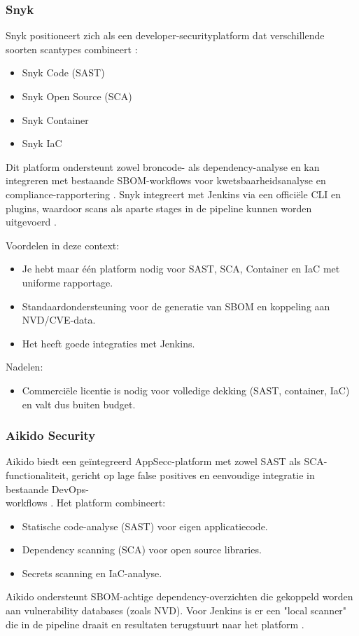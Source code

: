 \subsubsection{Snyk}
Snyk positioneert zich als een developer-securityplatform dat verschillende soorten scantypes combineert \autocite{SnykFeatures}:
\begin{itemize}
  \item Snyk Code (SAST)
  \item Snyk Open Source (SCA)
  \item Snyk Container
  \item Snyk IaC
\end{itemize}

Dit platform ondersteunt zowel broncode- als dependency-analyse en kan integreren met bestaande SBOM-workflows voor kwetsbaarheidsanalyse en compliance-rapportering \autocite{SnykFeatures}. Snyk integreert met Jenkins via een officiële CLI en plugins, waardoor scans als aparte stages in de pipeline kunnen worden uitgevoerd \autocite{SnykJenkins}.

Voordelen in deze context:
\begin{itemize}
  \item Je hebt maar één platform nodig voor SAST, SCA, Container en IaC met uniforme rapportage.
  \item Standaardondersteuning voor de generatie van SBOM en koppeling aan\\NVD/CVE-data. 
  \item Het heeft goede integraties met Jenkins.
\end{itemize}

Nadelen:
\begin{itemize}
  \item Commerciële licentie is nodig voor volledige dekking (SAST, container, IaC) en valt dus buiten budget.
\end{itemize}
\subsubsection{Aikido Security}
Aikido biedt een geïntegreerd AppSecc-platform met zowel SAST als SCA-\\functionaliteit, gericht op lage false positives en eenvoudige integratie in bestaande DevOps-\\workflows \autocite{AikidoPlatform}.
Het platform combineert:
\begin{itemize}
  \item Statische code-analyse (SAST) voor eigen applicatiecode.
  \item Dependency scanning (SCA) voor open source libraries.
  \item Secrets scanning en IaC-analyse.
\end{itemize}
Aikido ondersteunt SBOM-achtige dependency-overzichten die gekoppeld worden aan vulnerability databases (zoals NVD). Voor Jenkins is er een "local scanner" die in de pipeline draait en resultaten terugstuurt naar het platform \autocite{AikidoJenkins}.

